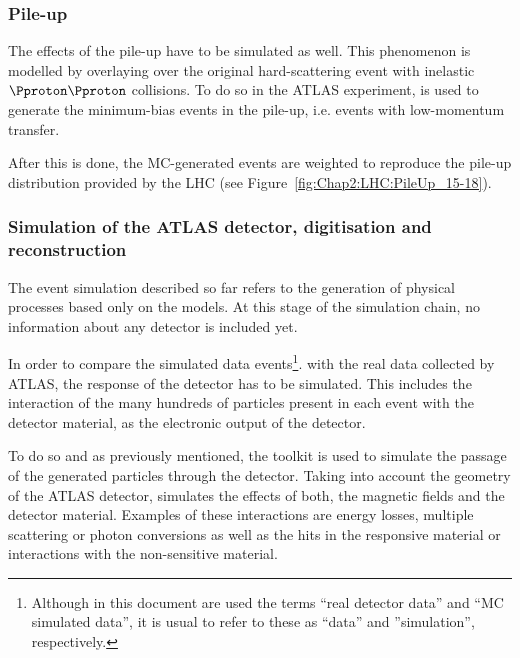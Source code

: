 
\subsubsection{Pile-up}
\label{chap:DataAndMC:pileup}
The effects of the pile-up have to
be simulated as well. This phenomenon is modelled 
by overlaying over the original hard-scattering event with
inelastic $\Pproton \Pproton$ collisions. 
To do so in the ATLAS experiment, \PYTHIA[8] is 
used to generate
the minimum-bias events in the pile-up, i.e. events with low-momentum transfer. 

After this is done, the MC-generated events are weighted to 
reproduce the pile-up distribution provided by the LHC (see Figure~\ref{fig:Chap2:LHC:PileUp_15-18}).

\subsubsection{Simulation of the ATLAS detector, digitisation and reconstruction}
\label{sec:Chap3.1:MC:Steps:Reco}
The event simulation described so far refers to the generation of physical 
processes based only on the models. At this stage of the simulation chain, 
no information about any detector is included yet. %

In order to compare the simulated data events\footnote{Although 
in this document are used the 
terms ``real detector data'' and ``MC simulated data'', it is usual to refer to these 
as ``data'' and ''simulation'', respectively.}.  with the real data
collected by ATLAS, the response of the detector has to be simulated. 
This includes the interaction of the many hundreds of particles present
in each event with the detector material, as the electronic output of the detector. 

To do so and as previously mentioned, the \GEANT toolkit is used to simulate the passage of 
the generated particles through the detector. Taking into account the geometry of the ATLAS detector,
 \GEANT simulates the effects of both, the magnetic fields and 
the detector material. Examples of these interactions are energy losses, multiple
scattering or photon conversions as well as the hits in the responsive material or interactions
with the non-sensitive material.

